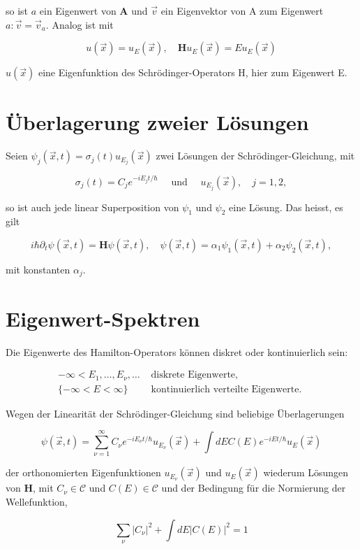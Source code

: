\documentclass[10pt, letterpaper]{article}
\begin{document}
so ist $a$ ein Eigenwert von $\mathbf{A}$ und $\vec{v}$ ein Eigenvektor von A zum Eigenwert $a: \vec{v}=\vec{v}_{a}$. Analog ist mit

$$
u(\vec{x})=u_{E}(\vec{x}), \quad \mathbf{H} u_{E}(\vec{x})=E u_{E}(\vec{x})
$$

$u(\vec{x})$ eine Eigenfunktion des Schrödinger-Operators H, hier zum Eigenwert E.

\section*{Überlagerung zweier Lösungen}
Seien $\psi_{j}(\vec{x}, t)=\sigma_{j}(t) u_{E_{j}}(\vec{x})$ zwei Lösungen der Schrödinger-Gleichung, mit

$$
\sigma_{j}(t)=C_{j} e^{-i E_{j} t / \hbar} \quad \text { und } \quad u_{E_{j}}(\vec{x}), \quad j=1,2,
$$

so ist auch jede linear Superposition von $\psi_{1}$ und $\psi_{2}$ eine Lösung. Das heisst, es gilt

$$
i \hbar \partial_{t} \psi(\vec{x}, t)=\mathbf{H} \psi(\vec{x}, t), \quad \psi(\vec{x}, t)=\alpha_{1} \psi_{1}(\vec{x}, t)+\alpha_{2} \psi_{2}(\vec{x}, t),
$$

mit konstanten $\alpha_{j}$.

\section*{Eigenwert-Spektren}
Die Eigenwerte des Hamilton-Operators können diskret oder kontinuierlich sein:

$$
\begin{aligned}
-\infty<E_{1}, \ldots, E_{\nu}, \ldots & \text { diskrete Eigenwerte, } \\
\{-\infty<E<\infty\} & \text { kontinuierlich verteilte Eigenwerte. }
\end{aligned}
$$

Wegen der Linearität der Schrödinger-Gleichung sind beliebige Überlagerungen

$$
\psi(\vec{x}, t)=\sum_{\nu=1}^{\infty} C_{\nu} e^{-i E_{\nu} t / \hbar} u_{E_{\nu}}(\vec{x})+\int d E C(E) e^{-i E t / \hbar} u_{E}(\vec{x})
$$

der orthonomierten Eigenfunktionen $u_{E_{\nu}}(\vec{x})$ und $u_{E}(\vec{x})$ wiederum Lösungen von $\mathbf{H}$, mit $C_{\nu} \in \mathcal{C}$ und $C(E) \in \mathcal{C}$ und der Bedingung für die Normierung der Wellefunktion,

$$
\sum_{\nu}\left|C_{\nu}\right|^{2}+\int d E|C(E)|^{2}=1
$$
\end{document}
